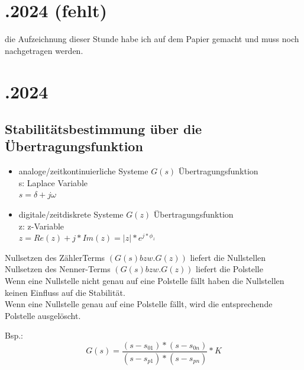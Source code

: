 \documentclass{article}
\begin{document}
\newpage
\section*{.2024 (fehlt)}
die Aufzeichnung dieser Stunde habe ich auf dem Papier gemacht und muss noch nachgetragen werden.

\newpage
\section*{.2024}
\subsection*{Stabilitätsbestimmung über die Übertragungsfunktion}
\begin{itemize}
	\item analoge/zeitkontinuierliche Systeme $G(s)$ Übertragungsfunktion \\
	s: Laplace Variable \\
	$s=\delta+j\omega$
	\item digitale/zeitdiskrete Systeme $G(z)$ Übertragungsfunktion \\
	z: z-Variable \\
	$z=Re(z) + j * Im(z) = |z| * e^{j*\phi_z} $
\end{itemize}
Nullsetzen des ZählerTerms $(G(s) bzw. G(z))$ liefert die Nullstellen \\
Nullsetzen des Nenner-Terms $(G(s) bzw. G(z))$ liefert die Polstelle \\
Wenn eine Nullstelle nicht genau auf eine Polstelle fällt haben die Nullstellen keinen Einfluss auf die Stabilität. \\
Wenn eine Nullstelle genau auf eine Polstelle fällt, wird die entsprechende Polstelle ausgelöscht.
\begin{center}
Bsp.:
\[
G(s) = \frac{ (s-s_{01}) * (s-s_{0n}) }{ (s-s_{p1}) * (s-s_{pn}) }*K
\]
\end{center}
\end{document}
